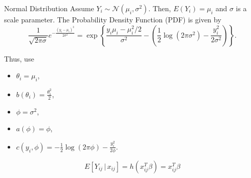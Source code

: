 \documentclass[UTF8,a4paper,10pt]{article}
\begin{document}
  \begin{mybox}{Normal Distribution}
Assume $Y_i \sim \mathcal{N}(\mu_i, \sigma^2)$. Then, $E(Y_i) = \mu_i$ and $\sigma$ is a scale parameter. The Probability Density Function (PDF) is given by
\[
\frac{1}{\sqrt{2\pi\sigma}}e^{-\frac{(y_i - \mu_i)^2}{2\sigma^2}} = \exp\left\{\frac{y_i\mu_i - \mu_i^2/2}{\sigma^2} - \left(\frac{1}{2}\log(2\pi\sigma^2) - \frac{y_i^2}{2\sigma^2}\right)\right\}.
\]

Thus, use 

\begin{itemize}
  \item $\theta_i = \mu_i$,
  \item $b(\theta_i) = \frac{\theta_i^2}{2}$,
  \item $\phi = \sigma^2$, 
  \item $a(\phi) = \phi$,
  \item $c(y_i, \phi) = -\frac{1}{2}\log(2\pi\phi) - \frac{y_i^2}{2\phi}$.
\end{itemize}

\[E[Y_{ij}\,|\, x_{ij}] = h(x_{ij}^T\beta) = x_{ij}^T\beta\]


\end{mybox}
\pagebreak
\end{document}
